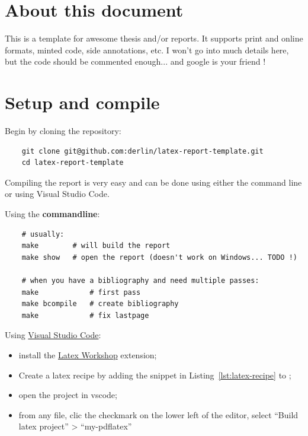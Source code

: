 
\section{About this document}

This is a template for awesome thesis and/or reports. 
It supports print and online formats, minted code, side annotations, etc. I won't go into much details here, but the code should be commented enough... and google is your friend !

\section{Setup and compile}

Begin by cloning the repository:

\begin{verbatim}
    git clone git@github.com:derlin/latex-report-template.git
    cd latex-report-template 
\end{verbatim}

Compiling the report is very easy and can be done using either the command line or using Visual Studio Code.

Using the \textbf{commandline}:

\begin{verbatim}
    # usually:
    make        # will build the report 
    make show   # open the report (doesn't work on Windows... TODO !)

    # when you have a bibliography and need multiple passes:
    make            # first pass
    make bcompile   # create bibliography
    make            # fix lastpage
\end{verbatim}

Using \href{https://code.visualstudio.com/}{Visual Studio Code}:

\begin{itemize}
    \item install the \href{https://github.com/James-Yu/LaTeX-Workshop}{Latex Workshop} extension;
    \item Create a latex recipe by adding the snippet in Listing~\ref{lst:latex-recipe} to ;
    \item open the project in vscode;
    \item from any  file, clic the checkmark on the lower left of the editor, select ``Build latex project'' > ``my-pdflatex''
\end{itemize}

